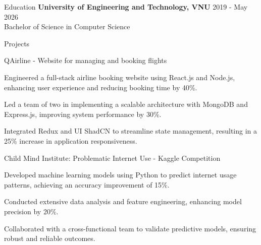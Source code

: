 \documentclass{resume} %
\begin{document}
\begin{rSection}{Education}
                        \textbf{University of Engineering and Technology, VNU} \hfill {2019 - May 2026} \\
                            {Bachelor of Science in Computer Science}
                         
             
         
    \end{rSection}

    \begin{rSection}{Projects}
                    \begin{rSubsection}
                                    {QAirline {-} Website for managing and booking flights}
                                {}{}{}
                                    \item Engineered a full{-}stack airline booking website using React.js and Node.js, enhancing user experience and reducing booking time by 40\%.
                                    \item Led a team of two in implementing a scalable architecture with MongoDB and Express.js, improving system performance by 30\%.
                                    \item Integrated Redux and UI ShadCN to streamline state management, resulting in a 25\% increase in application responsiveness.
                            \end{rSubsection}
                    \begin{rSubsection}
                                    {Child Mind Institute: Problematic Internet Use {-} Kaggle Competition}
                                {}{}{}
                                    \item Developed machine learning models using Python to predict internet usage patterns, achieving an accuracy improvement of 15\%.
                                    \item Conducted extensive data analysis and feature engineering, enhancing model precision by 20\%.
                                    \item Collaborated with a cross{-}functional team to validate predictive models, ensuring robust and reliable outcomes.
                            \end{rSubsection}
                    \begin{rSubsection}

\end{rSubsection}
\end{rSection}
\end{document}
